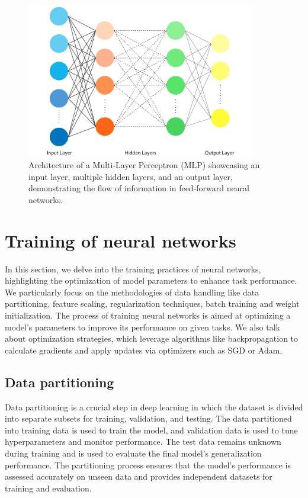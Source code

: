 \begin{figure}[ht]
    \centering
    \includegraphics[width=10cm]{images/Theory-DL/MLP.png}
    \caption{Architecture of a Multi-Layer Perceptron (MLP) showcasing an input layer, multiple hidden layers, and an output layer, demonstrating the flow of information in feed-forward neural networks.}
    \label{fig:MLP}
  \end{figure}
\section{Training of neural networks}\label{optrain}
In this section, we delve into the training practices of neural networks, highlighting the optimization of model parameters to enhance task performance. We particularly focus on the methodologies of data handling like data partitioning, feature scaling, regularization techniques, batch training and weight initialization.
The process of training neural networks is aimed at optimizing a model's parameters to improve its performance on given tasks. We also talk about optimization strategies, which leverage algorithms like backpropagation to calculate gradients and apply updates via optimizers such as SGD or Adam.
\subsection{Data partitioning}Data partitioning is a crucial step in deep learning in which the dataset is divided into separate subsets for training, validation, and testing. The data partitioned into training data is used to train the model, and validation data is used to tune hyperparameters and monitor performance. The test data remains unknown during training and is used to evaluate the final model's generalization performance. The partitioning process ensures that the model's performance is assessed accurately on unseen data and provides independent datasets for training and evaluation. 
